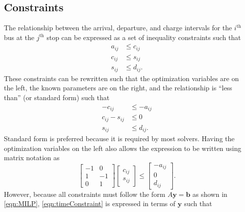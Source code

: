 \subsection{Constraints\label{sec:formulation:constraint}}
The relationship between the arrival, departure, and charge intervals for the $i^{\text{th}}$ bus at the $j^{\text{th}}$ stop can be expressed as a set of inequality constraints such that
\begin{equation}\begin{aligned}
	a_{ij} &\le c_{ij} \\
	c_{ij} &\le s_{ij} \\
	s_{ij} &\le d_{ij}.
\end{aligned}\end{equation}
These constraints can be rewritten such that the optimization variables are on the left, the known parameters are on the right, and the relationship is ``less than'' (or standard form) such that
\begin{equation}\begin{aligned}
	-c_{ij} &\le -a_{ij}\\
	c_{ij} - s_{ij} &\le 0\\
	s_{ij} &\le d_{ij}.
\end{aligned}\end{equation}
Standard form is preferred because it is required by most solvers. Having the optimization variables on the left also allows the expression to be written using matrix notation as 
\begin{equation}\label{eqn:timeConstraint}
	\begin{bmatrix} -1 & 0 \\
	                 1 & -1 \\
		0 & 1\end{bmatrix} \begin{bmatrix} c_{ij} \\ s_{ij}\end{bmatrix} \le \begin{bmatrix}-a_{ij} \\ 0 \\ d_{ij} \end{bmatrix}.
\end{equation}
	However, because all constraints must follow the form $A\mathbf{y} = \mathbf{b}$ as shown in \eqref{eqn:MILP}, \eqref{eqn:timeConstraint} is expressed in terms of $\mathbf{y}$ such that
